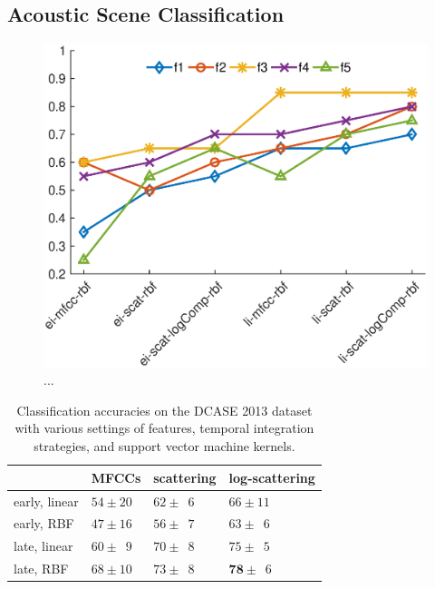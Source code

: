 \documentclass[journal]{IEEEtran}
\begin{document}
\subsection{Acoustic Scene Classification}


\begin{figure}
\begin{center}
\includegraphics[width=\columnwidth]{gfx/supervised_rbf_test3.eps}
\caption{...}
\end{center}
\end{figure}

\begin{table}
\begin{center}
\begin{tabular}{llll}
             & MFCCs         & scattering & log-scattering  \\
             \hline
early, linear  & $54\pm20$   & $62\pm\phantom{0}6$  & $66\pm11$     \\
early, RBF     & $47\pm16$  & $56\pm\phantom{0}7$  & $63\pm\phantom{0}6$   \\
late, linear  & $60\pm\phantom{0}9$ & $70\pm\phantom{0}8$  & $75\pm\phantom{0}5$   \\
late, RBF     & $68\pm10$ & $73\pm\phantom{0}8$  & $\mathbf{78}\pm\phantom{0}6$   \\
\end{tabular}
\caption{Classification accuracies on the DCASE 2013 dataset with various settings of features, temporal integration strategies, and support vector machine kernels.}
\end{center}
\end{table}
\end{document}
